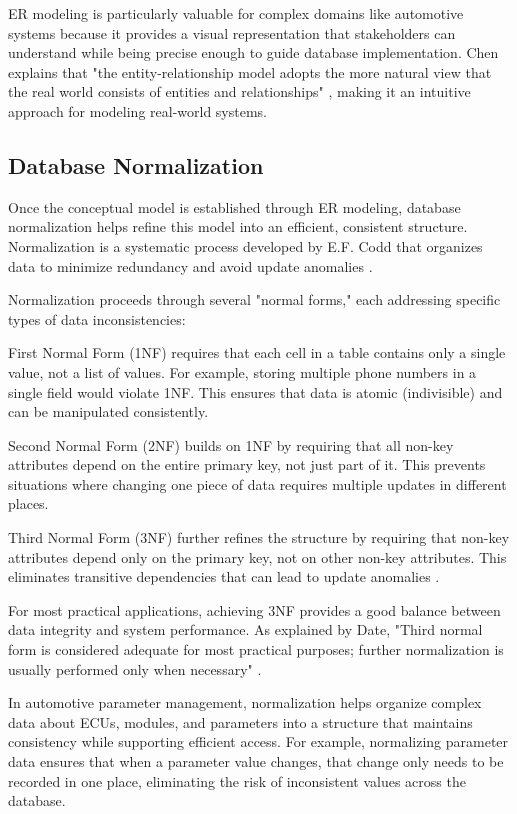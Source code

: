 ER modeling is particularly valuable for complex domains like automotive systems because it provides a visual representation that stakeholders can understand while being precise enough to guide database implementation. Chen explains that "the entity-relationship model adopts the more natural view that the real world consists of entities and relationships" \cite{chen1976entity}, making it an intuitive approach for modeling real-world systems.

\subsection{Database Normalization}
\label{subsec:database-normalization}

Once the conceptual model is established through ER modeling, database normalization helps refine this model into an efficient, consistent structure. Normalization is a systematic process developed by E.F. Codd that organizes data to minimize redundancy and avoid update anomalies \cite{codd1970relational}.

Normalization proceeds through several "normal forms," each addressing specific types of data inconsistencies:

First Normal Form (1NF) requires that each cell in a table contains only a single value, not a list of values. For example, storing multiple phone numbers in a single field would violate 1NF. This ensures that data is atomic (indivisible) and can be manipulated consistently.

Second Normal Form (2NF) builds on 1NF by requiring that all non-key attributes depend on the entire primary key, not just part of it. This prevents situations where changing one piece of data requires multiple updates in different places.

Third Normal Form (3NF) further refines the structure by requiring that non-key attributes depend only on the primary key, not on other non-key attributes. This eliminates transitive dependencies that can lead to update anomalies \cite{elmasri2015fundamentals}.

For most practical applications, achieving 3NF provides a good balance between data integrity and system performance. As explained by Date, "Third normal form is considered adequate for most practical purposes; further normalization is usually performed only when necessary" \cite{date2011sql}.

In automotive parameter management, normalization helps organize complex data about \acp{ECU}, modules, and parameters into a structure that maintains consistency while supporting efficient access. For example, normalizing parameter data ensures that when a parameter value changes, that change only needs to be recorded in one place, eliminating the risk of inconsistent values across the database.

